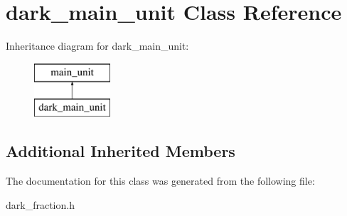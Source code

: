 \hypertarget{classdark__main__unit}{}\section{dark\+\_\+main\+\_\+unit Class Reference}
\label{classdark__main__unit}
Inheritance diagram for dark\+\_\+main\+\_\+unit\+:\begin{figure}[H]
\begin{center}
\leavevmode
\includegraphics[height=2.000000cm]{classdark__main__unit}
\end{center}
\end{figure}
\subsection*{Additional Inherited Members}


The documentation for this class was generated from the following file\+:\begin{DoxyCompactItemize}
\item 
dark\+\_\+fraction.\+h\end{DoxyCompactItemize}

